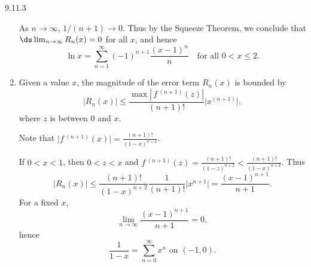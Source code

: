 \begin{Answer}{9.11.3}
\begin{enumerate}
{As $n\to\infty$, $1/(n+1)\to0$. Thus by the Squeeze Theorem, we conclude that $\ds \lim_{n\to\infty} R_n(x) = 0$ for all $x$, and hence
$$\ln x = \sum_{n=1}^\infty (-1)^{n+1}\frac{(x-1)^{n}}{n}\quad \text{for all $0<x\leq 2$}.$$
}
\item
{Given a value $x$, the magnitude of the error term $R_n(x)$ is bounded by
$$ \big|R_n(x)\big| \leq \frac{\max\left|\,f\,^{(n+1)}(z)\right|}{(n+1)!}\big|x^{(n+1)}\big|,$$
where $z$ is between $0$ and $x$.

Note that $\big|f\,^{(n+1)}(x)\big| = \frac{(n+1)!}{(1-x)^{n+2}}$.


If $0<x<1$, then $0<z<x$ and $f\,^{(n+1)}(z) =\frac{(n+1)!}{(1-z)^{n+2}}<\frac{(n+1)!}{(1-x)^{n+2}}$.
Thus
$$ \big|R_n(x)\big| \leq \frac{(n+1)!}{(1-x)^{n+2}}\frac{1}{(n+1)!}\big|x^{n+1}\big|= \frac{(x-1)^{n+1}}{n+1}.$$
For a fixed $x$,
$$\lim_{n\to\infty} \frac{(x-1)^{n+1}}{n+1}=0,$$
hence
$$\frac{1}{1-x} = \sum_{n=0}^\infty x^n \text{ on } (-1,0).$$




}
\end{enumerate}
\end{Answer}
